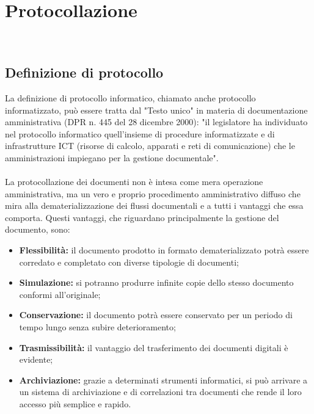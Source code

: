 
\chapter{Protocollazione}
\label{cap:protocollazione}

\\

\section{Definizione di protocollo}
La definizione di protocollo informatico, chiamato anche protocollo informatizzato, può essere tratta dal "Testo unico" in materia di documentazione amministrativa (DPR n. 445 del 28 dicembre 2000): "il legislatore ha individuato nel protocollo informatico quell'insieme di procedure informatizzate e di infrastrutture ICT (risorse di calcolo, apparati e reti di comunicazione) che le amministrazioni impiegano per la gestione documentale".
\\
\\
La protocollazione dei documenti non è intesa come mera operazione amministrativa, ma un vero e proprio procedimento amministrativo diffuso che mira alla dematerializzazione dei flussi documentali e a tutti i vantaggi che essa comporta.
Questi vantaggi, che riguardano principalmente la gestione del documento, sono:
\begin{itemize}
    \item \textbf{Flessibilità:} il documento prodotto in formato dematerializzato potrà essere corredato e completato con diverse tipologie di documenti;
    
    \item \textbf{Simulazione:} si potranno produrre infinite copie dello stesso documento conformi all'originale;
    
    \item \textbf{Conservazione:} il documento potrà essere conservato per un periodo di tempo lungo senza subire deterioramento;
    
    \item \textbf{Trasmissibilità:} il vantaggio del trasferimento dei documenti digitali è evidente;
    
    \item \textbf{Archiviazione:} grazie a determinati strumenti informatici, si può arrivare a un sistema di archiviazione e di correlazioni tra documenti che rende il loro accesso più semplice e rapido.
\end{itemize}
